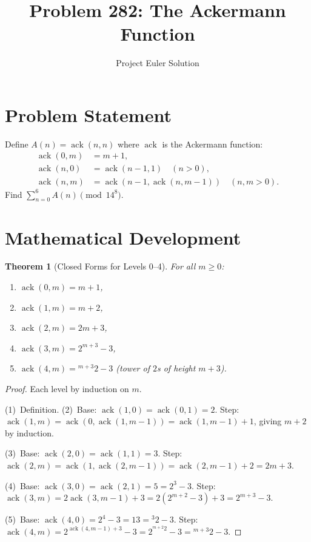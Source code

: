 \documentclass[12pt]{article}
\title{Problem 282: The Ackermann Function}
\author{Project Euler Solution}
\date{}
\newtheorem{theorem}{Theorem}
\begin{document}
\maketitle

\section{Problem Statement}

Define $A(n) = \operatorname{ack}(n,n)$ where $\operatorname{ack}$ is the Ackermann function:
\begin{align*}
\operatorname{ack}(0,m) &= m+1, \\
\operatorname{ack}(n,0) &= \operatorname{ack}(n-1,1) \quad (n>0), \\
\operatorname{ack}(n,m) &= \operatorname{ack}(n-1,\operatorname{ack}(n,m-1)) \quad (n,m>0).
\end{align*}
Find $\displaystyle\sum_{n=0}^{6} A(n) \pmod{14^8}$.

\section{Mathematical Development}

\begin{theorem}[Closed Forms for Levels 0--4]
For all $m \ge 0$:
\begin{enumerate}
\item $\operatorname{ack}(0,m) = m+1$,
\item $\operatorname{ack}(1,m) = m+2$,
\item $\operatorname{ack}(2,m) = 2m+3$,
\item $\operatorname{ack}(3,m) = 2^{m+3}-3$,
\item $\operatorname{ack}(4,m) = {}^{m+3}2 - 3$ (tower of $2$s of height $m+3$).
\end{enumerate}
\end{theorem}

\begin{proof}
Each level by induction on $m$.

(1)~Definition. (2)~Base: $\operatorname{ack}(1,0) = \operatorname{ack}(0,1) = 2$. Step: $\operatorname{ack}(1,m) = \operatorname{ack}(0,\operatorname{ack}(1,m-1)) = \operatorname{ack}(1,m-1)+1$, giving $m+2$ by induction.

(3)~Base: $\operatorname{ack}(2,0) = \operatorname{ack}(1,1) = 3$. Step: $\operatorname{ack}(2,m) = \operatorname{ack}(1,\operatorname{ack}(2,m-1)) = \operatorname{ack}(2,m-1)+2 = 2m+3$.

(4)~Base: $\operatorname{ack}(3,0) = \operatorname{ack}(2,1) = 5 = 2^3-3$. Step: $\operatorname{ack}(3,m) = 2\operatorname{ack}(3,m-1)+3 = 2(2^{m+2}-3)+3 = 2^{m+3}-3$.

(5)~Base: $\operatorname{ack}(4,0) = 2^4-3 = 13 = {}^{3}2 - 3$. Step: $\operatorname{ack}(4,m) = 2^{\operatorname{ack}(4,m-1)+3}-3 = 2^{{}^{m+2}2}-3 = {}^{m+3}2-3$.
\end{proof}
\end{document}
